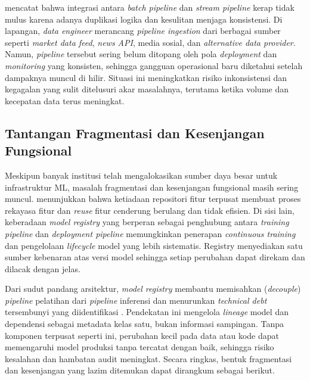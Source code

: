 \textcite{rodrigues2025architecture} mencatat bahwa integrasi antara \textit{batch pipeline} dan \textit{stream pipeline} kerap tidak mulus karena adanya duplikasi logika dan kesulitan menjaga konsistensi. Di lapangan, \textit{data engineer} merancang \textit{pipeline ingestion} dari berbagai sumber seperti \textit{market data feed}, \textit{news API}, media sosial, dan \textit{alternative data provider}. Namun, \textit{pipeline} tersebut sering belum ditopang oleh pola \textit{deployment} dan \textit{monitoring} yang konsisten, sehingga gangguan operasional baru diketahui setelah dampaknya muncul di hilir. Situasi ini meningkatkan risiko inkonsistensi dan kegagalan yang sulit ditelusuri akar masalahnya, terutama ketika volume dan kecepatan data terus meningkat.

\subsection{Tantangan Fragmentasi dan Kesenjangan Fungsional}

Meskipun banyak institusi telah mengalokasikan sumber daya besar untuk infrastruktur ML, masalah fragmentasi dan kesenjangan fungsional masih sering muncul. \textcite{polyzotis2018data} menunjukkan bahwa ketiadaan repositori fitur terpusat membuat proses rekayasa fitur dan \textit{reuse} fitur cenderung berulang dan tidak efisien. Di sisi lain, keberadaan \textit{model registry} yang berperan sebagai penghubung antara \textit{training pipeline} dan \textit{deployment pipeline} memungkinkan penerapan \textit{continuous training} dan pengelolaan \textit{lifecycle} model yang lebih sistematis. Registry menyediakan satu sumber kebenaran atas versi model sehingga setiap perubahan dapat direkam dan dilacak dengan jelas.

Dari sudut pandang arsitektur, \textit{model registry} membantu memisahkan (\textit{decouple}) \textit{pipeline} pelatihan dari \textit{pipeline} inferensi dan menurunkan \textit{technical debt} tersembunyi yang diidentifikasi \textcite{sculley2015hidden}. Pendekatan ini mengelola \textit{lineage} model dan dependensi sebagai metadata kelas satu, bukan informasi sampingan. Tanpa komponen terpusat seperti ini, perubahan kecil pada data atau kode dapat memengaruhi model produksi tanpa tercatat dengan baik, sehingga risiko kesalahan dan hambatan audit meningkat. Secara ringkas, bentuk fragmentasi dan kesenjangan yang lazim ditemukan dapat dirangkum sebagai berikut.

